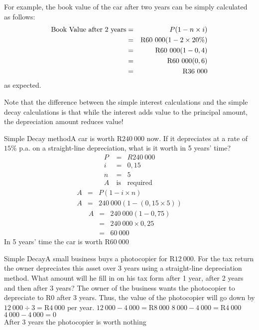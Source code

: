 For example, the book value of the car after two years can be simply calculated as follows:
\begin{eqnarray*}
\mbox{Book Value after 2 years} &=& P(1-n\times i)\\
&=&\rm{R}60~000(1-2\times 20\%)\\
&=&\rm{R}60~000(1-0,4)\\
&=&\rm{R}60~000(0,6)\\
&=&\rm{R}36~000
\end{eqnarray*}
as expected.

Note that the difference between the simple interest calculations and the simple decay calculations is that while the interest adds value to the principal amount, the depreciation amount reduces value!

\begin{wex}{Simple Decay method}{A car is worth R$240~000$ now.  If it depreciates at a rate of $15\%$ p.a. on a straight-line depreciation, what is it worth in 5 years' time?}{
\begin{eqnarray*}
P &=& R240~000\\
i &=& 0,15\\
n &=& 5\\
A~ &\mbox{is}& \mbox{required}
\end{eqnarray*}
\begin{eqnarray*}
A &=& P(1 - i\times n)\\
A &=& 240~000(1-(0,15\times 5))
\end{eqnarray*}
\begin{eqnarray*}
A &=& 240~000(1 - 0,75)\\
&=& 240~000\times 0,25\\
&=& 60~000
\end{eqnarray*}
In 5 years' time the car is worth R$60~000$}
\end{wex}

\begin{wex}{Simple Decay}{A small business buys a photocopier for R$12~000$.  For the tax return the owner depreciates this asset over 3 years using a straight-line depreciation method.  What amount will he fill in on his tax form after 1 year, after 2 years and then after 3 years?}{
The owner of the business wants the photocopier to depreciate to R$0$ after 3 years.
Thus, the value of the photocopier will go down by $12~000 \div 3 = \mbox{R}4~000$ per year.
$12~000 - 4~000 = \mbox{R}8~000$
$8~000 - 4~000 = \mbox{R}4~000$
$4~000 - 4~000 = 0$\\
After 3 years the photocopier is worth nothing}
\end{wex}

